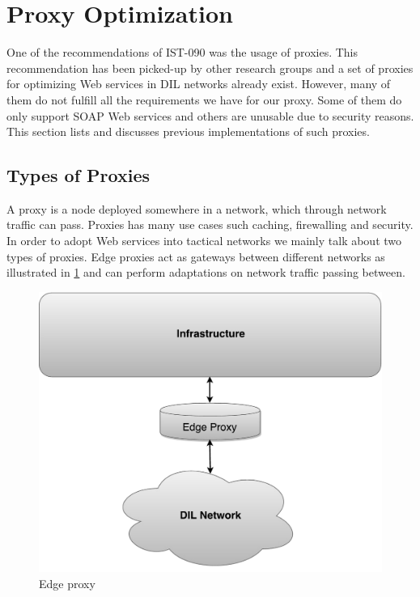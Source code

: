 \section{Proxy Optimization}

One of the recommendations of IST-090 was the usage of proxies. This
recommendation has been picked-up by other research groups and a set of proxies
for optimizing Web services in DIL networks already exist. However, many of them
do not fulfill all the requirements we have for our proxy. Some of them do
only support SOAP Web services and others are unusable due to security reasons.
This section lists and discusses previous implementations of such proxies.

\subsection{Types of Proxies}

A proxy is a node deployed somewhere in a network, which through network traffic
can pass. Proxies has many use cases such caching, firewalling and security. In
order to adopt Web services into tactical networks we mainly talk about two
types of proxies. Edge proxies act as gateways between different networks as
illustrated in \cref{figure:edge} and can perform adaptations on network traffic
passing between.

\begin{figure}[h]
\includegraphics[scale=0.35]{images/edge_proxy.pdf}
\caption{Edge proxy}
\label{figure:edge}
\end{figure}

